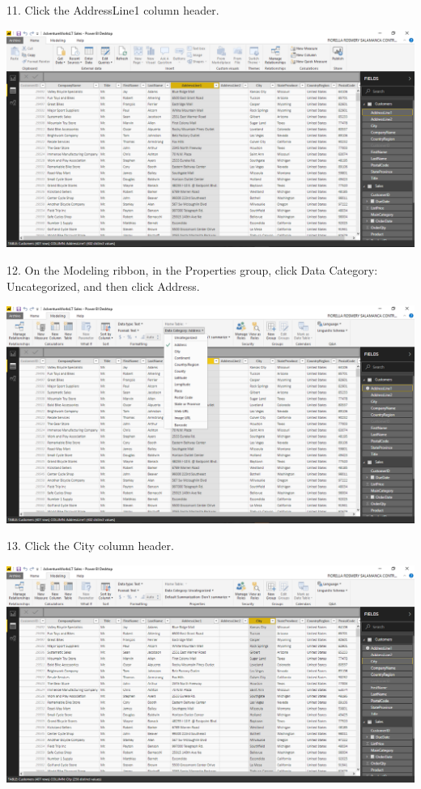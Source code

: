 11. Click the AddressLine1 column header.\\

	\begin{center}
	\includegraphics[width=17cm]{./Imagenes/Ejercicio1/Tarea3/9}
	\end{center}	

12. On the Modeling ribbon, in the Properties group, click Data Category: Uncategorized, and then click Address.\\

	\begin{center}
	\includegraphics[width=17cm]{./Imagenes/Ejercicio1/Tarea3/10}
	\end{center}	

13. Click the City column header.\\

	\begin{center}
	\includegraphics[width=17cm]{./Imagenes/Ejercicio1/Tarea3/11}
	\end{center}	

